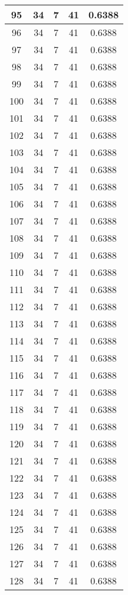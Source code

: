 \documentclass[letterpaper, 12pt]{article}
\begin{document}
\begin{longtable}{|c|c|c|c|c|}
\hline
95 & 34 & 7 & 41 & 0.6388 \\
\hline
96 & 34 & 7 & 41 & 0.6388 \\
\hline
97 & 34 & 7 & 41 & 0.6388 \\
\hline
98 & 34 & 7 & 41 & 0.6388 \\
\hline
99 & 34 & 7 & 41 & 0.6388 \\
\hline
100 & 34 & 7 & 41 & 0.6388 \\
\hline
101 & 34 & 7 & 41 & 0.6388 \\
\hline
102 & 34 & 7 & 41 & 0.6388 \\
\hline
103 & 34 & 7 & 41 & 0.6388 \\
\hline
104 & 34 & 7 & 41 & 0.6388 \\
\hline
105 & 34 & 7 & 41 & 0.6388 \\
\hline
106 & 34 & 7 & 41 & 0.6388 \\
\hline
107 & 34 & 7 & 41 & 0.6388 \\
\hline
108 & 34 & 7 & 41 & 0.6388 \\
\hline
109 & 34 & 7 & 41 & 0.6388 \\
\hline
110 & 34 & 7 & 41 & 0.6388 \\
\hline
111 & 34 & 7 & 41 & 0.6388 \\
\hline
112 & 34 & 7 & 41 & 0.6388 \\
\hline
113 & 34 & 7 & 41 & 0.6388 \\
\hline
114 & 34 & 7 & 41 & 0.6388 \\
\hline
115 & 34 & 7 & 41 & 0.6388 \\
\hline
116 & 34 & 7 & 41 & 0.6388 \\
\hline
117 & 34 & 7 & 41 & 0.6388 \\
\hline
118 & 34 & 7 & 41 & 0.6388 \\
\hline
119 & 34 & 7 & 41 & 0.6388 \\
\hline
120 & 34 & 7 & 41 & 0.6388 \\
\hline
121 & 34 & 7 & 41 & 0.6388 \\
\hline
122 & 34 & 7 & 41 & 0.6388 \\
\hline
123 & 34 & 7 & 41 & 0.6388 \\
\hline
124 & 34 & 7 & 41 & 0.6388 \\
\hline
125 & 34 & 7 & 41 & 0.6388 \\
\hline
126 & 34 & 7 & 41 & 0.6388 \\
\hline
127 & 34 & 7 & 41 & 0.6388 \\
\hline
128 & 34 & 7 & 41 & 0.6388 \\

\end{longtable}
\end{document}
